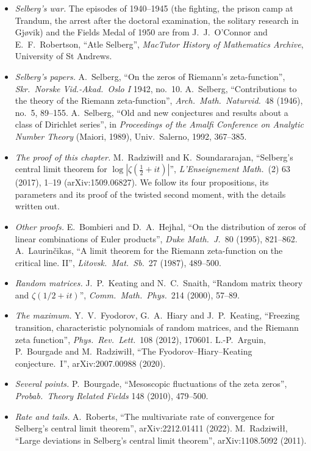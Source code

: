 \begin{itemize}
\item \emph{Selberg's war.} The episodes of 1940--1945 (the fighting, the prison camp at Trandum, the arrest after the doctoral examination, the solitary research in Gj\o{}vik) and the Fields Medal of 1950 are from J.~J.~O'Connor and E.~F.~Robertson, ``Atle Selberg'', \emph{MacTutor History of Mathematics Archive}, University of St Andrews.
\item \emph{Selberg's papers.} A.~Selberg, ``On the zeros of Riemann's zeta-function'', \emph{Skr.\ Norske Vid.-Akad.\ Oslo I} 1942, no.~10. A.~Selberg, ``Contributions to the theory of the Riemann zeta-function'', \emph{Arch.\ Math.\ Naturvid.}\ 48 (1946), no.~5, 89--155. A.~Selberg, ``Old and new conjectures and results about a class of Dirichlet series'', in \emph{Proceedings of the Amalfi Conference on Analytic Number Theory} (Maiori, 1989), Univ.\ Salerno, 1992, 367--385.
\item \emph{The proof of this chapter.} M.~Radziwi\l\l{} and K.~Soundararajan, ``Selberg's central limit theorem for $\log|\zeta(\frac12+it)|$'', \emph{L'Enseignement Math.}\ (2) 63 (2017), 1--19 (arXiv:1509.06827). We follow its four propositions, its parameters and its proof of the twisted second moment, with the details written out.
\item \emph{Other proofs.} E.~Bombieri and D.~A.~Hejhal, ``On the distribution of zeros of linear combinations of Euler products'', \emph{Duke Math.\ J.}\ 80 (1995), 821--862. A.~Laurinčikas, ``A limit theorem for the Riemann zeta-function on the critical line. II'', \emph{Litovsk.\ Mat.\ Sb.}\ 27 (1987), 489--500.
\item \emph{Random matrices.} J.~P.~Keating and N.~C.~Snaith, ``Random matrix theory and $\zeta(1/2+it)$'', \emph{Comm.\ Math.\ Phys.}\ 214 (2000), 57--89.
\item \emph{The maximum.} Y.~V.~Fyodorov, G.~A.~Hiary and J.~P.~Keating, ``Freezing transition, characteristic polynomials of random matrices, and the Riemann zeta function'', \emph{Phys.\ Rev.\ Lett.}\ 108 (2012), 170601. L.-P.~Arguin, P.~Bourgade and M.~Radziwi\l\l, ``The Fyodorov--Hiary--Keating conjecture.~I'', arXiv:2007.00988 (2020).
\item \emph{Several points.} P.~Bourgade, ``Mesoscopic fluctuations of the zeta zeros'', \emph{Probab.\ Theory Related Fields} 148 (2010), 479--500.
\item \emph{Rate and tails.} A.~Roberts, ``The multivariate rate of convergence for Selberg's central limit theorem'', arXiv:2212.01411 (2022). M.~Radziwi\l\l, ``Large deviations in Selberg's central limit theorem'', arXiv:1108.5092 (2011).
\end{itemize}
